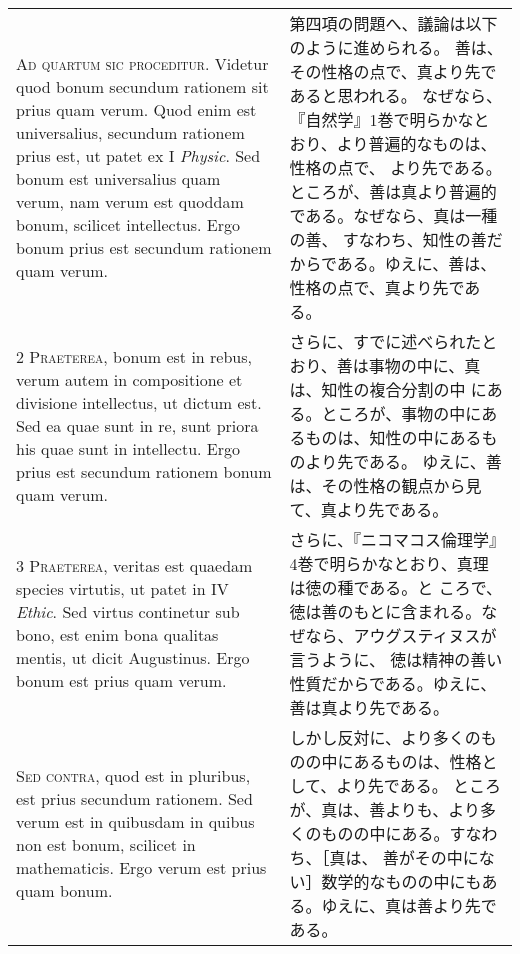 \documentclass[10pt]{jsarticle} %
\begin{document}
\begin{longtable}{p{21em}p{21em}}

{\huge A}{\scshape d quartum sic proceditur}. Videtur quod
bonum secundum rationem sit prius quam verum. Quod enim est
universalius, secundum rationem prius est, ut patet ex I {\itshape Physic}. Sed
bonum est universalius quam verum, nam verum est quoddam bonum, scilicet
intellectus. Ergo bonum prius est secundum rationem quam verum.

&
第四項の問題へ、議論は以下のように進められる。
善は、その性格の点で、真より先であると思われる。
なぜなら、『自然学』1巻で明らかなとおり、より普遍的なものは、性格の点で、
 より先である。ところが、善は真より普遍的である。なぜなら、真は一種の善、
 すなわち、知性の善だからである。ゆえに、善は、性格の点で、真より先であ
 る。

\\


{\scshape 2 Praeterea}, bonum est in rebus, verum autem
in compositione et divisione intellectus, ut dictum est. Sed ea quae
sunt in re, sunt priora his quae sunt in intellectu. Ergo prius est
secundum rationem bonum quam verum.

&

さらに、すでに述べられたとおり、善は事物の中に、真は、知性の複合分割の中
 にある。ところが、事物の中にあるものは、知性の中にあるものより先である。
 ゆえに、善は、その性格の観点から見て、真より先である。

\\


{\scshape 3 Praeterea}, veritas est quaedam species virtutis, ut patet
in IV {\itshape Ethic}. Sed virtus continetur sub bono, est enim bona
qualitas mentis, ut dicit Augustinus. Ergo bonum est prius quam verum.

&
さらに、『ニコマコス倫理学』4巻で明らかなとおり、真理は徳の種である。と
 ころで、徳は善のもとに含まれる。なぜなら、アウグスティヌスが言うように、
 徳は精神の善い性質だからである。ゆえに、善は真より先である。



\\


{\scshape Sed contra}, quod est in pluribus, est prius
secundum rationem. Sed verum est in quibusdam in quibus non est bonum,
scilicet in mathematicis. Ergo verum est prius quam bonum.

&

しかし反対に、より多くのものの中にあるものは、性格として、より先である。
 ところが、真は、善よりも、より多くのものの中にある。すなわち、［真は、
 善がその中にない］数学的なものの中にもある。ゆえに、真は善より先である。


\end{longtable}
\end{document}
